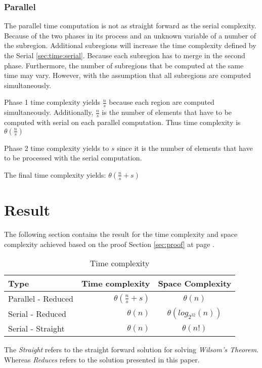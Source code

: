\documentclass[12pt, oneside, onecolumn]{article}
\begin{document}
\subsubsection{Parallel}
The parallel time computation is not as straight forward as the serial complexity. Because of the two phases in its process and an unknown variable of a number of the subregion. Additional subregions will increase the time complexity defined by the Serial \ref{sec:time:serial}. Because each subregion has to merge in the second phase. Furthermore, the number of subregions that be computed at the same time may vary. However, with the assumption that all subregions are computed simultaneously.

%
Phase 1 time complexity yields $\frac{n}{s}$ because each region are computed simultaneously. Additionally, $\frac{n}{s}$ is the number of elements that have to be computed with serial on each parallel computation. Thus time complexity is $\theta(\frac{n}{s})$

%
Phase 2 time complexity yields to $s$ since it is the number of elements that have to be processed with the serial computation.

The final time complexity yields: $\theta(\frac{n}{s} + s)$

\newpage
\section{Result}
The following section contains the result for the time complexity and space complexity achieved based on the proof Section \ref{sec:proof} at page \pageref{sec:proof}.

\begin{table}[!h]
\centering
\begin{tabular}{ | l | r | c | }
\hline
Type & Time complexity  & Space Complexity				 										\\ \hline
Parallel - Reduced 	& $\theta(\frac{n}{s} + s)$ 				& $\theta(n)$				  	\\ \hline
Serial - Reduced 	& $\theta(n)$ 								& $\theta(log_{2^{32}}(n))$	\\ \hline
Serial - Straight 	& $\theta(n)$ 								& $\theta(n!)$ 					\\ \hline
\end{tabular}
\caption{Time complexity}
\label{tab:res}
\end{table}
The \emph{Straight} refers to the straight forward solution for solving\emph{ Wilsom's Theorem}. Whereas \emph{Reduces} refers to the solution presented in this paper.
\end{document}
